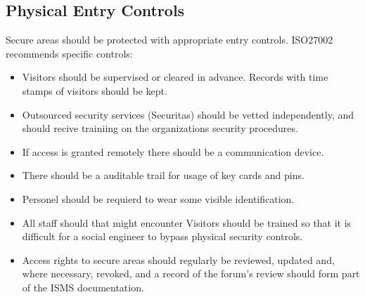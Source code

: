 \subsection{Physical Entry Controls}
Secure areas should be protected with appropriate entry controls. ISO27002
recommends specific controls:
\begin{itemize}
    \item Visitors should be supervised or cleared in advance. Records with
    time stamps of visitors should be kept. 

    \item Outsourced security services (Securitas) should be vetted 
    independently, and should recive trainiing on the organizations security 
    procedures.

    \item If access is granted remotely there should be a communication device.

    \item There should be a auditable trail for usage of key cards and pins.

    \item Personel should be requierd to wear some visible identification.

    \item All staff should that might encounter Visitors should be trained so that
    it is difficult for a social engineer to bypass physical security controls.

    \item Access rights to secure areas should regularly be reviewed, updated and,
    where necessary, revoked, and a record of the forum’s review should form 
    part of the ISMS documentation.

\end{itemize}

